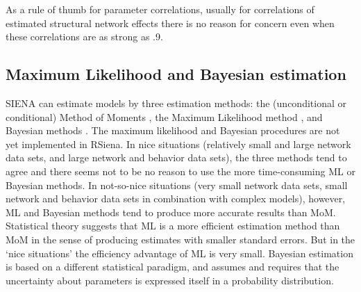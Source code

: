 \documentclass[a4paper,fleqn]{article}
\newcommand{\+}{\, + \,}
\newcommand{\SI}{{\sf SIENA }}
\begin{document}
{As a rule of thumb for parameter correlations,
usually for correlations of estimated structural network effects there is no
reason for concern even when these correlations
are as strong as .9.

\begin{screen}
\newpage
\end{screen}
\begin{print}
\end{print}

\iffalse
\subsection{Maximum Likelihood and Bayesian estimation}
\label{S_ML}
\label{S_Bayes}

\SI can estimate models by three estimation methods: the (unconditional or conditional)
Method of Moments \citep*[`MoM', the default;][]{Snijders01; SnijdersEA07},
the Maximum Likelihood method \citep[`ML', see][]{SnijdersEA10},
and Bayesian methods
\citep[see][]{Koskinen04, KoskinenSnijders07, SchweinbergerSnijders07c}.
The maximum likelihood and Bayesian procedures are not yet
implemented in RSiena.
In nice situations (relatively small and large network data sets,
and large network and behavior data sets),
the three methods tend to agree
and there seems not to be no reason to use the more time-consuming
ML or Bayesian methods.
In not-so-nice situations (very small network data sets, small network and behavior
data sets in combination with complex models),
however, ML and Bayesian methods tend to produce more accurate results
than MoM.
Statistical theory suggests that ML is a more efficient estimation method
than MoM in the sense of producing estimates with smaller standard errors.
But in the `nice situations' the efficiency advantage of ML is very small.
Bayesian estimation is based on a different statistical paradigm, and
assumes and requires that the uncertainty about parameters is expressed
itself in a probability distribution.

}
\end{document}
